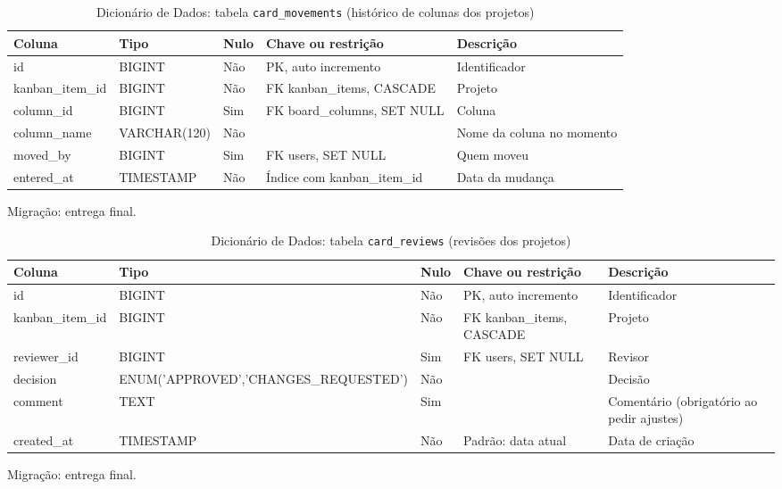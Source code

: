 \begin{table}[H]
\centering
\footnotesize
\caption{Dicionário de Dados: tabela \texttt{card\_\allowbreak{}movements} (histórico de colunas dos projetos)}
\label{tab:dd-card-movements}
\begin{tabular}{|>{\raggedright\arraybackslash}p{3.0cm}|>{\raggedright\arraybackslash}p{3.2cm}|>{\centering\arraybackslash}p{0.8cm}|>{\raggedright\arraybackslash}p{3.0cm}|>{\raggedright\arraybackslash}p{3.8cm}|}
\hline
\textbf{Coluna} & \textbf{Tipo} & \textbf{Nulo} & \textbf{Chave ou restrição} & \textbf{Descrição} \\
\hline
id & BIGINT & Não & PK, auto incremento & Identificador \\
\hline
kanban\_\allowbreak{}item\_\allowbreak{}id & BIGINT & Não & FK kanban\_\allowbreak{}items, CASCADE & Projeto \\
\hline
column\_\allowbreak{}id & BIGINT & Sim & FK board\_\allowbreak{}columns, SET NULL & Coluna \\
\hline
column\_\allowbreak{}name & VARCHAR(120) & Não &  & Nome da coluna no momento \\
\hline
moved\_\allowbreak{}by & BIGINT & Sim & FK users, SET NULL & Quem moveu \\
\hline
entered\_\allowbreak{}at & TIMESTAMP & Não & Índice com kanban\_\allowbreak{}item\_\allowbreak{}id & Data da mudança \\
\hline
\end{tabular}
\par\footnotesize Migração: entrega final.
\end{table}

\begin{table}[H]
\centering
\footnotesize
\caption{Dicionário de Dados: tabela \texttt{card\_\allowbreak{}reviews} (revisões dos projetos)}
\label{tab:dd-card-reviews}
\begin{tabular}{|>{\raggedright\arraybackslash}p{3.0cm}|>{\raggedright\arraybackslash}p{3.2cm}|>{\centering\arraybackslash}p{0.8cm}|>{\raggedright\arraybackslash}p{3.0cm}|>{\raggedright\arraybackslash}p{3.8cm}|}
\hline
\textbf{Coluna} & \textbf{Tipo} & \textbf{Nulo} & \textbf{Chave ou restrição} & \textbf{Descrição} \\
\hline
id & BIGINT & Não & PK, auto incremento & Identificador \\
\hline
kanban\_\allowbreak{}item\_\allowbreak{}id & BIGINT & Não & FK kanban\_\allowbreak{}items, CASCADE & Projeto \\
\hline
reviewer\_\allowbreak{}id & BIGINT & Sim & FK users, SET NULL & Revisor \\
\hline
decision & ENUM('APPROVED',\allowbreak 'CHANGES\_\allowbreak{}REQUESTED') & Não &  & Decisão \\
\hline
comment & TEXT & Sim &  & Comentário (obrigatório ao pedir ajustes) \\
\hline
created\_\allowbreak{}at & TIMESTAMP & Não & Padrão: data atual & Data de criação \\
\hline
\end{tabular}
\par\footnotesize Migração: entrega final.
\end{table}

